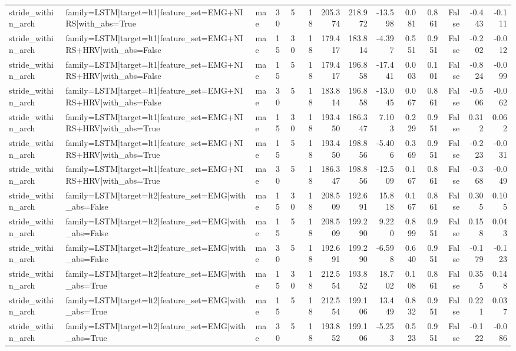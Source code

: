 \begin{table}
\begin{tabular}{lllllrrrrrrrrr}
stride_within_arch & family=LSTM|target=lt1|feature_set=EMG+NIRS|with_abs=True & mae & 30 & 5 & 18 & 205.374 & 218.972 & -13.598 & 0.081 & 0.861 & False & -0.443 & -0.111 \\
stride_within_arch & family=LSTM|target=lt1|feature_set=EMG+NIRS+HRV|with_abs=False & mae & 15 & 30 & 18 & 179.417 & 183.814 & -4.397 & 0.551 & 0.951 & False & -0.202 & -0.012 \\
stride_within_arch & family=LSTM|target=lt1|feature_set=EMG+NIRS+HRV|with_abs=False & mae & 15 & 5 & 18 & 179.417 & 196.858 & -17.441 & 0.003 & 0.101 & False & -0.824 & -0.099 \\
stride_within_arch & family=LSTM|target=lt1|feature_set=EMG+NIRS+HRV|with_abs=False & mae & 30 & 5 & 18 & 183.814 & 196.858 & -13.045 & 0.067 & 0.861 & False & -0.506 & -0.062 \\
stride_within_arch & family=LSTM|target=lt1|feature_set=EMG+NIRS+HRV|with_abs=True & mae & 15 & 30 & 18 & 193.450 & 186.347 & 7.103 & 0.229 & 0.951 & False & 0.312 & 0.062 \\
stride_within_arch & family=LSTM|target=lt1|feature_set=EMG+NIRS+HRV|with_abs=True & mae & 15 & 5 & 18 & 193.450 & 198.856 & -5.406 & 0.369 & 0.951 & False & -0.223 & -0.031 \\
stride_within_arch & family=LSTM|target=lt1|feature_set=EMG+NIRS+HRV|with_abs=True & mae & 30 & 5 & 18 & 186.347 & 198.856 & -12.509 & 0.167 & 0.861 & False & -0.368 & -0.049 \\
stride_within_arch & family=LSTM|target=lt2|feature_set=EMG|with_abs=False & mae & 15 & 30 & 18 & 208.509 & 192.691 & 15.818 & 0.167 & 0.861 & False & 0.305 & 0.105 \\
stride_within_arch & family=LSTM|target=lt2|feature_set=EMG|with_abs=False & mae & 15 & 5 & 18 & 208.509 & 199.290 & 9.220 & 0.899 & 0.951 & False & 0.158 & 0.043 \\
stride_within_arch & family=LSTM|target=lt2|feature_set=EMG|with_abs=False & mae & 30 & 5 & 18 & 192.691 & 199.290 & -6.598 & 0.640 & 0.951 & False & -0.179 & -0.123 \\
stride_within_arch & family=LSTM|target=lt2|feature_set=EMG|with_abs=True & mae & 15 & 30 & 18 & 212.554 & 193.852 & 18.702 & 0.108 & 0.861 & False & 0.355 & 0.148 \\
stride_within_arch & family=LSTM|target=lt2|feature_set=EMG|with_abs=True & mae & 15 & 5 & 18 & 212.554 & 199.106 & 13.449 & 0.832 & 0.951 & False & 0.221 & 0.037 \\
stride_within_arch & family=LSTM|target=lt2|feature_set=EMG|with_abs=True & mae & 30 & 5 & 18 & 193.852 & 199.106 & -5.253 & 0.523 & 0.951 & False & -0.122 & -0.086 \\

\end{tabular}
\end{table}
